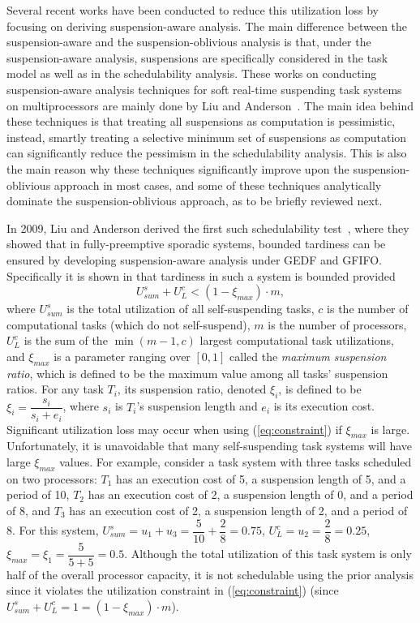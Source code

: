 Several recent works have been conducted to reduce this utilization loss by focusing on deriving suspension-aware analysis. The main difference between the suspension-aware and the suspension-oblivious analysis is that, under the suspension-aware analysis, suspensions are specifically considered in the task model as well as in the schedulability analysis. These works on conducting suspension-aware analysis techniques for soft real-time suspending task systems on multiprocessors are mainly done by Liu and Anderson~\cite{Liu3,Liu4,Liu5,Liu9,Liu11}. The main idea behind these techniques is that treating all suspensions as computation is pessimistic, instead, smartly treating a selective minimum set of suspensions as computation can significantly reduce the pessimism in the schedulability analysis. This is also the main reason why these techniques significantly improve upon the suspension-oblivious approach in most cases, and some of these techniques analytically dominate the suspension-oblivious approach, as to be briefly reviewed next.

In 2009, Liu and Anderson derived the first such schedulability test~\cite{Liu3}, where they showed that in fully-preemptive sporadic systems, bounded tardiness can be ensured by developing suspension-aware analysis under GEDF and GFIFO. Specifically it is shown in \cite{Liu3} that tardiness in such a system is bounded provided 
\begin{equation}\label{eq:constraint} U_{sum}^s + U_L^c < (1-\xi_{max}) \cdot m , \end{equation}
where $U_{sum}^s$ is the total utilization of all self-suspending tasks, $c$ is the number of computational tasks (which do not self-suspend), $m$ is the number of processors, $U_L^c$ is the sum of the $\min(m-1,c)$ largest computational task utilizations, and $\xi_{max}$ is a parameter ranging over $[0,1]$ called the \textit{maximum suspension ratio}, which is defined to be the maximum value among all tasks' suspension ratios. For any task $T_i$, its suspension ratio, denoted $\xi_i$, is defined to be $\xi_i = \dfrac{s_i}{s_i+e_i}$, where $s_i$ is $T_i$'s suspension length and $e_i$ is its execution cost.  Significant utilization loss may occur when using (\ref{eq:constraint}) if $\xi_{max}$ is large. Unfortunately, it is unavoidable that many self-suspending task systems will have large $\xi_{max}$ values. For example, consider a task system with three tasks scheduled on two processors: $T_1$ has an execution cost of 5, a suspension length of 5, and a period of 10, $T_2$ has an execution cost of 2, a suspension length of 0, and a period of 8, and $T_3$ has an execution cost of 2, a suspension length of 2, and a period of 8. For this system, $U_{sum}^s = u_1+u_3= \dfrac{5}{10} + \dfrac{2}{8} = 0.75$, $U_L^c = u_2 = \dfrac{2}{8} = 0.25$, $\xi_{max} = \xi_1 = \dfrac{5}{5+5} = 0.5$. Although the total utilization of this task system is only half of the overall processor capacity, it is not schedulable using the prior analysis since it violates the utilization constraint in (\ref{eq:constraint}) (since $U_{sum}^s+U_L^c =1=(1-\xi_{max}) \cdot m$).

